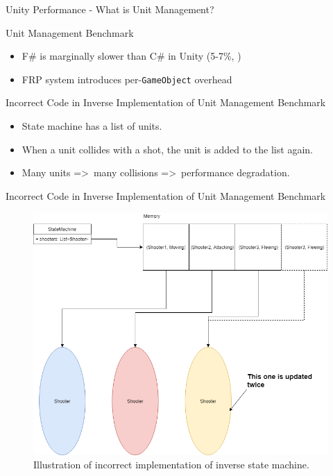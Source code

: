 \begin{frame}{\secname}{\subsecname}
	Unity Performance - What is Unit Management?
\end{frame}

\begin{frame}{\secname}{\subsecname}
	Unit Management Benchmark
	\begin{itemize}
		\item<2-> F\# is marginally slower than C\# in Unity (5-7\%, \cite{maggiore2012formal,bolhuis2019gameplay})
		\item<3-> FRP system introduces per-\texttt{GameObject} overhead
	\end{itemize}
\end{frame}

\begin{frame}{\secname}{\subsecname}
	Incorrect Code in Inverse Implementation of Unit Management Benchmark
	\begin{itemize}
		\item<1-> State machine has a list of units.
		\item<2-> When a unit collides with a shot, the unit is added to the list again.
		\item<3-> Many units =\textgreater\ many collisions =\textgreater\ performance degradation.
	\end{itemize}
\end{frame}

\begin{frame}{\secname}{\subsecname}
	Incorrect Code in Inverse Implementation of Unit Management Benchmark
	\begin{figure}[h!]
		\centering
		\includegraphics[width=.7\textwidth]{pictures/statemachine.png}
		\caption{Illustration of incorrect implementation of inverse state machine.}
		\label{fig:incorrect:statemachine}
	\end{figure}
\end{frame}

